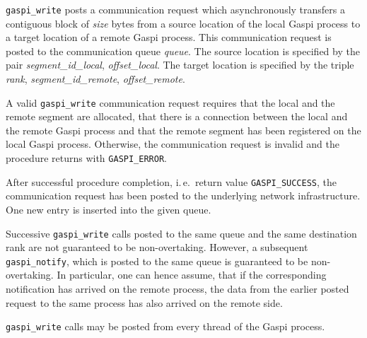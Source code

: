 \documentclass[a4paper]{article}
\makeatletter
\newlength{\st}\setlength{\st}{0pt}
\newcommand{\zsep}[1]{#1}
\newcommand{\gaspiprefix}{gaspi}
\newcommand{\GASPI}{{\sc Gaspi}}
\newcommand{\function}[1]{{\tt #1}}
\newcommand{\parameter}[1]{{\it #1}}
\newcommand{\gaspifunction}[1]{\function{\protect\zsep{\gaspiprefix\_#1}}}
\newcounter{counttodo}
\newlength{\savetabcolsep}
\newlength{\savearrayrulewidth}
\newenvironment{todo}
{\stepcounter{counttodo}
 \typeout{Environment TODO call \thecounttodo}
 \setlength{\savetabcolsep}{\tabcolsep}
 \setlength{\savearrayrulewidth}{\arrayrulewidth}
 \renewcommand{\tabcolsep}{0pt}
 \renewcommand{\arrayrulewidth}{2pt}
 \begin{center}
 \begin{tabular}{c|l@{\hspace*{2em}}|@{\hspace*{2em}}c}
 &
 \begin{minipage}{0.66\textwidth}
 \begin{itemize}
}
{\end{itemize}
 \end{minipage}
 &  todo \#\thecounttodo
 \end{tabular} \marginpar{$\Longleftarrow$}
 \end{center}
 \renewcommand{\tabcolsep}{\savetabcolsep}
 \renewcommand{\arrayrulewidth}{\savearrayrulewidth}
}
\newcommand{\GASPISUCC}{{\tt\protect\zsep{GASPI\_SUCCESS}}}
\newcommand{\GASPIGERR}{{\tt\protect\zsep{GASPI\_ERROR}}}
\makeatother
\begin{document}
\gaspifunction{write} posts a communication request which asynchronously transfers a contiguous block
of \parameter{size} bytes from a source location of the local \GASPI{} process to a target location of a
remote \GASPI{} process. This communication request is posted to the communication queue \parameter{queue}.
The source location is specified by the pair \parameter{segment\_id\_local}, \parameter{offset\_local}. The
target location is specified by the triple \parameter{rank}, \parameter{segment\_id\_remote},
\parameter{offset\_remote}.


A valid \gaspifunction{write} communication request requires that the local and the
remote segment are allocated, that there is a connection between the local
and the remote \GASPI{} process and that the remote segment has been registered
on the local \GASPI{} process. Otherwise, the communication request is invalid
and the procedure returns with \GASPIGERR{}.

After successful procedure completion, i.\,e.\ return value \GASPISUCC{}, the communication request has
been posted to the underlying network infrastructure. One new entry is
inserted into the given queue.

Successive \gaspifunction{write} calls posted to the same queue and
the same destination rank are not guaranteed to be non-overtaking.
However, a subsequent \gaspifunction{notify}, which is posted to the same queue is 
guaranteed to be non-overtaking.   In particular, one can hence assume, that if 
the corresponding notification has arrived on the remote process, the data from the
earlier posted request to the same process has also arrived on the remote
side.

\gaspifunction{write} calls may be posted from every thread of the \GASPI{} process.
\end{document}
